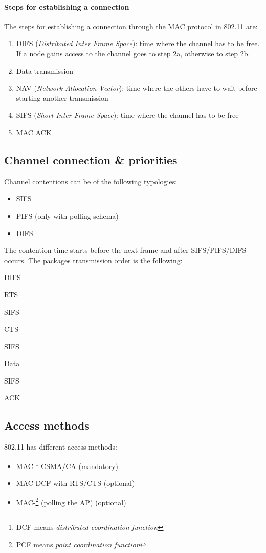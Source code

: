 \paragraph*{Steps for establishing a connection}
The steps for establishing a connection through the MAC protocol in 802.11 are:
\begin{enumerate}
\item[1] DIFS (\textit{Distributed Inter Frame Space}): time where the channel
  has to be free. If a node gains access to the channel goes to step 2a,
  otherwise to step 2b.
\item[2a] Data transmission
\item[2b] NAV (\textit{Network Allocation Vector}): time where the others have
  to wait before starting another transmission
\item[3] SIFS (\textit{Short Inter Frame Space}): time where the channel has to
  be free
\item[4] MAC ACK
\end{enumerate}

\subsection{Channel connection \& priorities}
Channel contentions can be of the following typologies:
\begin{itemize}
\item SIFS
\item PIFS (only with polling schema)
\item DIFS
\end{itemize}

The contention time starts before the next frame and after SIFS/PIFS/DIFS
occurs.
The packages transmission order is the following:
\begin{AutoMultiColEnumerate}
\item DIFS
\item RTS
\item SIFS
\item CTS
\item SIFS
\item Data
\item SIFS
\item ACK
\end{AutoMultiColEnumerate}

\subsection{Access methods}
802.11 has different access methods:
\begin{itemize}
\item MAC-\footnote{
DCF means \textit{distributed coordination  function}
} CSMA/CA (mandatory)
\item MAC-DCF with RTS/CTS (optional)
\item MAC-\footnote{
PCF means \textit{point coordination function}
} (polling the AP) (optional)
\end{itemize}


